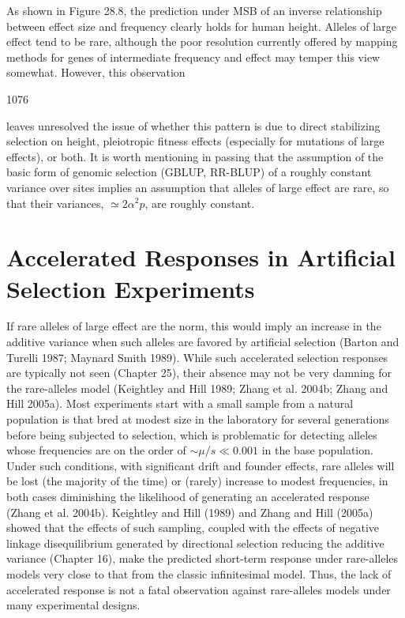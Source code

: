 \documentclass{article}
\begin{document}
As shown in Figure 28.8, the prediction under MSB of an inverse relationship between effect size and frequency clearly holds for human height. Alleles of large effect tend to be rare, although the poor resolution currently offered by mapping methods for genes of intermediate frequency and effect may temper this view somewhat. However, this observation

1076

leaves unresolved the issue of whether this pattern is due to direct stabilizing selection on height, pleiotropic fitness effects (especially for mutations of large effects), or both. It is worth mentioning in passing that the assumption of the basic form of genomic selection (GBLUP, RR-BLUP) of a roughly constant variance over sites implies an assumption that alleles of large effect are rare, so that their variances,  $ \simeq 2\alpha^{2}p $, are roughly constant.

\section{Accelerated Responses in Artificial Selection Experiments}
If rare alleles of large effect are the norm, this would imply an increase in the additive variance when such alleles are favored by artificial selection (Barton and Turelli 1987; Maynard Smith 1989). While such accelerated selection responses are typically not seen (Chapter 25), their absence may not be very damning for the rare-alleles model (Keightley and Hill 1989; Zhang et al. 2004b; Zhang and Hill 2005a). Most experiments start with a small sample from a natural population is that bred at modest size in the laboratory for several generations before being subjected to selection, which is problematic for detecting alleles whose frequencies are on the order of  $ \sim\mu/s \ll 0.001 $ in the base population. Under such conditions, with significant drift and founder effects, rare alleles will be lost (the majority of the time) or (rarely) increase to modest frequencies, in both cases diminishing the likelihood of generating an accelerated response (Zhang et al. 2004b). Keightley and Hill (1989) and Zhang and Hill (2005a) showed that the effects of such sampling, coupled with the effects of negative linkage disequilibrium generated by directional selection reducing the additive variance (Chapter 16), make the predicted short-term response under rare-alleles models very close to that from the classic infinitesimal model. Thus, the lack of accelerated response is not a fatal observation against rare-alleles models under many experimental designs.
\end{document}
